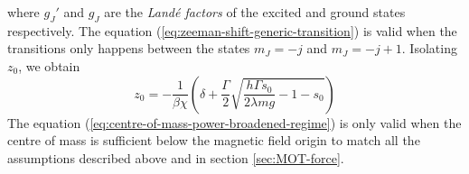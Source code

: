 where $ g_J' $ and $ g_J $ are the \textit{Landé factors} of the excited and ground states respectively. The equation (\ref{eq:zeeman-shift-generic-transition}) is valid when the transitions only happens between the states $ m_J = -j $ and $ m_J = -j + 1 $. Isolating $ z_0 $, we obtain
\begin{equation}
    z_0 = - \frac{1}{\beta \chi} \left(\delta + \frac{\Gamma}{2} \sqrt{\frac{h \Gamma s_0}{2 \lambda m g} - 1 - s_0} \right)
    \label{eq:centre-of-mass-power-broadened-regime}
\end{equation}
The equation (\ref{eq:centre-of-mass-power-broadened-regime}) is only valid when the centre of mass is sufficient below the magnetic field origin to match all the assumptions described above and in section \ref{sec:MOT-force}.
